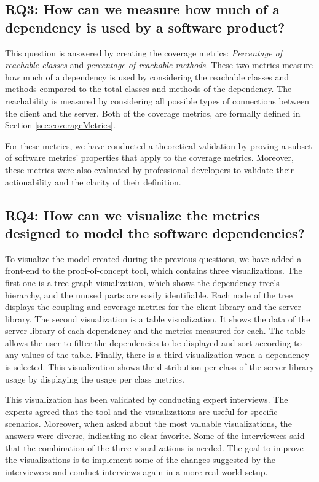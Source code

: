 \subsection{RQ3: How can we measure how much of a dependency is used by a software product?}

This question is answered by creating the coverage metrics: \textit{Percentage of reachable classes} and \textit{percentage of reachable methods}. These two metrics measure how much of a dependency is used by considering the reachable classes and methods compared to the total classes and methods of the dependency. The reachability is measured by considering all possible types of connections between the client and the server. Both of the coverage metrics, are formally defined in Section \ref{sec:coverageMetrics}.

For these metrics, we have conducted a theoretical validation by proving a subset of software metrics' properties that apply to the coverage metrics. Moreover, these metrics were also evaluated by professional developers to validate their actionability and the clarity of their definition.


\subsection{RQ4: How can we visualize the metrics designed to model the software dependencies?}

To visualize the model created during the previous questions, we have added a front-end to the proof-of-concept tool, which contains three visualizations. The first one is a tree graph visualization, which shows the dependency tree's hierarchy, and the unused parts are easily identifiable. Each node of the tree displays the coupling and coverage metrics for the client library and the server library. The second visualization is a table visualization. It shows the data of the server library of each dependency and the metrics measured for each. The table allows the user to filter the dependencies to be displayed and sort according to any values of the table. Finally, there is a third visualization when a dependency is selected. This visualization shows the distribution per class of the server library usage by displaying the usage per class metrics.

This visualization has been validated by conducting expert interviews. The experts agreed that the tool and the visualizations are useful for specific scenarios. Moreover, when asked about the most valuable visualizations, the answers were diverse, indicating no clear favorite. Some of the interviewees said that the combination of the three visualizations is needed. The goal to improve the visualizations is to implement some of the changes suggested by the interviewees and conduct interviews again in a more real-world setup.


